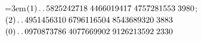 \par\noindent\hangindent=3em\enspace $(1)\mathinner{.\,.}5825242718\;\allowbreak 4466019417\;\allowbreak 4757281553\;\allowbreak 3980$; $(2)\mathinner{.\,.}4951456310\;\allowbreak 6796116504\;\allowbreak 8543689320\;\allowbreak 3883$ $(0)\mathinner{.\,.}0970873786\;\allowbreak 4077669902\;\allowbreak 9126213592\;\allowbreak 2330$\par\smallskip

\par\endgroup
